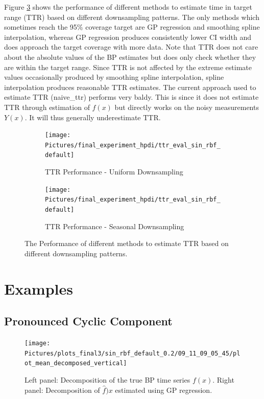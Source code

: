 Figure \ref{fig:ttr-performance} shows the performance of different methods to
estimate time in target range (TTR) based on different downsampling patterns.
The only methods which sometimes reach the 95\% coverage target are
GP regression and smoothing spline interpolation, whereas GP regression produces
consistently lower CI width and does approach the target coverage with more
data.
Note that TTR does not care about the absolute values of the BP estimates
but does only check whether they are within the target range.
Since TTR is not affected by the extreme estimate values
occasionally produced by smoothing spline interpolation,
spline interpolation produces reasonable TTR estimates.
The current approach used to estimate TTR (naive\_ttr) performs very baldy.
This is since it does not estimate TTR through estimation of $f(x)$ but directly
works on the noisy measurements $Y(x)$. It will thus generally underestimate
TTR.


\begin{figure}[!ht]
\centering
\begin{subfigure}{\textwidth}
    \centering
    \texttt{[image: Pictures/final\_experiment\_hpdi/ttr\_eval\_sin\_rbf\_default]}
    \caption{TTR Performance - Uniform Downsampling}
    \label{fig:ttr-uniform-sampling-performance}
\end{subfigure}

\bigskip

\begin{subfigure}{\textwidth}
    \centering
    \texttt{[image: Pictures/final\_experiment\_hpdi/ttr\_eval\_sin\_rbf\_default]}
    \caption{TTR Performance - Seasonal Downsampling}
    \label{fig:ttr-seasonal-sampling-performance}
\end{subfigure}
\caption[TTR Performance]{The Performance of different methods to
estimate TTR based on different downsampling patterns.
}
\label{fig:ttr-performance}
\end{figure}





\section{Examples}


\subsection{Pronounced Cyclic Component}

\begin{figure}[!ht]
\centering
    \texttt{[image: Pictures/plots\_final3/sin\_rbf\_default\_0.2/09\_11\_09\_05\_45/plot\_mean\_decomposed\_vertical]}
\caption[Decomposed BP time sereis]{Left panel: Decomposition of the true BP time series $f(x)$. Right panel:
Decomposition of $\hat{f})x$ estimated using GP regression.}
\label{fig:ex1-gp-prediction}
\end{figure}

